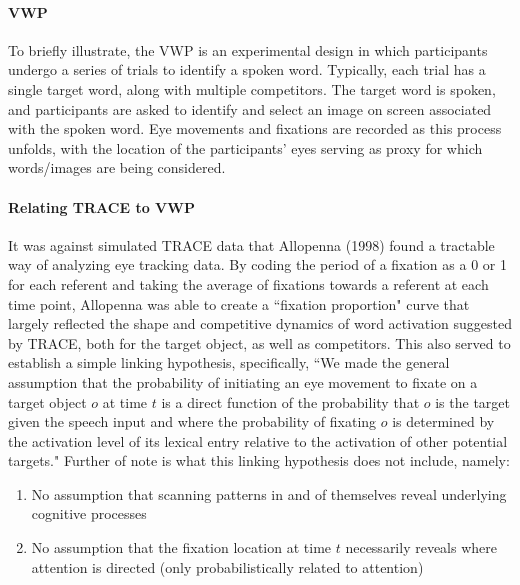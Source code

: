 \documentclass{article}
\begin{document}
\paragraph{VWP} To briefly illustrate, the VWP is an experimental design in which participants undergo a series of trials to identify a spoken word. Typically, each trial has a single target word, along with multiple competitors. The target word is spoken, and participants are asked to identify and select an image on screen associated with the spoken word. Eye movements and fixations are recorded as this process unfolds, with the location of the participants' eyes serving as proxy for which words/images are being considered. 

\paragraph{Relating TRACE to VWP} It was against simulated TRACE data that Allopenna (1998) found a tractable way of analyzing eye tracking data. By coding the period of a fixation as a 0 or 1 for each referent and taking the average of fixations towards a referent at each time point, Allopenna was able to create a ``fixation proportion" curve that largely reflected the shape and competitive dynamics of word activation suggested by TRACE, both for the target object, as well as competitors. This also served to establish a simple linking hypothesis, specifically, ``We made the general assumption that the probability of initiating an eye movement to fixate on a target object $o$ at time $t$ is a direct function of the probability that $o$ is the target given the speech input and where the probability of fixating $o$ is determined by the activation level of its lexical entry relative to the activation of other potential targets." Further of note is what this linking hypothesis does not include, namely:

\begin{singlespace}
\begin{enumerate}
\vspace{-3mm}
\item No assumption that scanning patterns in and of themselves reveal underlying cognitive processes
\item No assumption that the fixation location at time $t$ necessarily reveals where attention is directed (only probabilistically related to attention)
\end{enumerate}
\end{singlespace}
\end{document}
